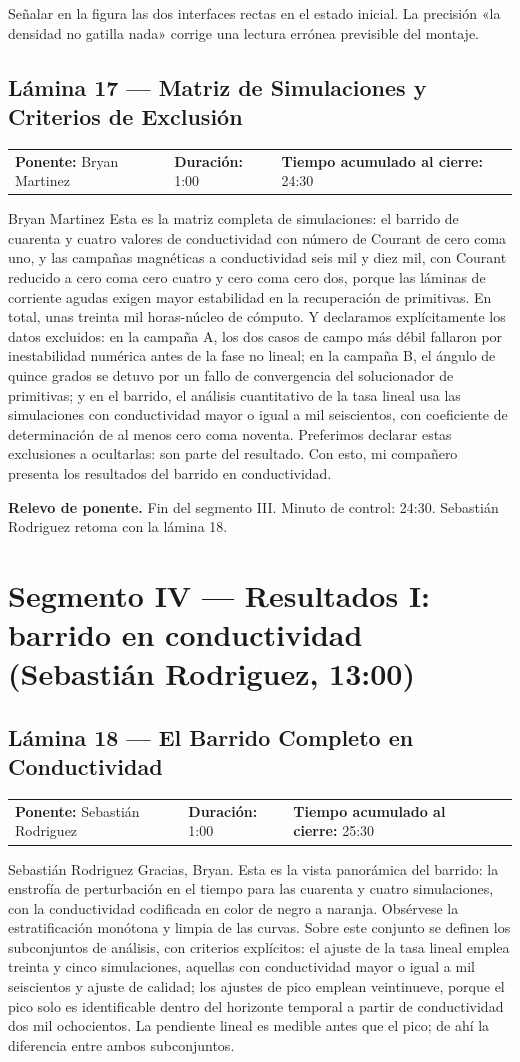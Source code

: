\documentclass[11pt,letterpaper]{article}
\makeatletter
\newcommand{\lamina}[5]{%
  \subsection*{Lámina #1 --- #2}
  \noindent
  \begin{tabular}{@{}llll@{}}
    \textbf{Ponente:} #3 &\quad \textbf{Duración:} #4 &\quad
    \textbf{Tiempo acumulado al cierre:} #5 &
  \end{tabular}
  \vspace{2pt}}
\newcommand{\relevo}[1]{%
  \begin{center}
  \begin{tcolorbox}[colback=gold!20,colframe=gold!80!black,boxrule=0.6pt,
    width=0.92\linewidth,arc=1.5pt,left=6pt,right=6pt,top=4pt,bottom=4pt]
    \small\textbf{Relevo de ponente.} #1
  \end{tcolorbox}
  \end{center}}
\makeatother
\begin{document}
\begin{indicaciones}
Señalar en la figura las dos interfaces rectas en el estado inicial. La
precisión «la densidad no gatilla nada» corrige una lectura errónea
previsible del montaje.
\end{indicaciones}

\lamina{17}{Matriz de Simulaciones y Criterios de Exclusión}{Bryan Martinez}{1:00}{24:30}

\begin{parlamento}{Bryan Martinez}
Esta es la matriz completa de simulaciones: el barrido de cuarenta y cuatro
valores de conductividad con número de Courant de cero coma uno, y las
campañas magnéticas a conductividad seis mil y diez mil, con Courant
reducido a cero coma cero cuatro y cero coma cero dos, porque las láminas de
corriente agudas exigen mayor estabilidad en la recuperación de primitivas.
En total, unas treinta mil horas-núcleo de cómputo. Y declaramos
explícitamente los datos excluidos: en la campaña A, los dos casos de campo
más débil fallaron por inestabilidad numérica antes de la fase no lineal; en
la campaña B, el ángulo de quince grados se detuvo por un fallo de
convergencia del solucionador de primitivas; y en el barrido, el análisis
cuantitativo de la tasa lineal usa las simulaciones con conductividad mayor
o igual a mil seiscientos, con coeficiente de determinación de al menos cero
coma noventa. Preferimos declarar estas exclusiones a ocultarlas: son parte
del resultado. Con esto, mi compañero presenta los resultados del barrido en
conductividad.
\end{parlamento}

\relevo{Fin del segmento III. Minuto de control: 24:30. Sebastián Rodriguez
retoma con la lámina 18.}

\section{Segmento IV --- Resultados I: barrido en conductividad (Sebastián Rodriguez, 13:00)}

\lamina{18}{El Barrido Completo en Conductividad}{Sebastián Rodriguez}{1:00}{25:30}

\begin{parlamento}{Sebastián Rodriguez}
Gracias, Bryan. Esta es la vista panorámica del barrido: la enstrofía de
perturbación en el tiempo para las cuarenta y cuatro simulaciones, con la
conductividad codificada en color de negro a naranja. Obsérvese la
estratificación monótona y limpia de las curvas. Sobre este conjunto se
definen los subconjuntos de análisis, con criterios explícitos: el ajuste de
la tasa lineal emplea treinta y cinco simulaciones, aquellas con
conductividad mayor o igual a mil seiscientos y ajuste de calidad; los
ajustes de pico emplean veintinueve, porque el pico solo es identificable
dentro del horizonte temporal a partir de conductividad dos mil
ochocientos. La pendiente lineal es medible antes que el pico; de ahí la
diferencia entre ambos subconjuntos.
\end{parlamento}
\end{document}
